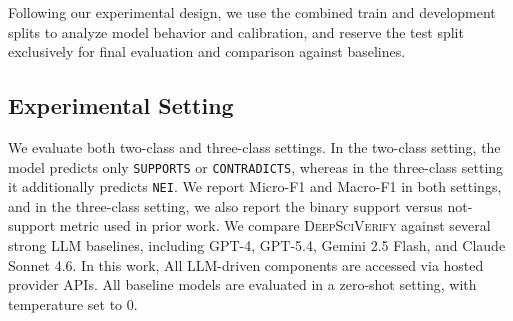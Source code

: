\documentclass{article}
\theoremstyle{plain}
\theoremstyle{definition}
\theoremstyle{remark}
\begin{document}
Following our experimental design, we use the combined train and development splits to analyze model behavior and calibration, and reserve the test split exclusively for final evaluation and comparison against baselines.




\subsection{Experimental Setting}
\label{sec:experimental_setting}

We evaluate both two-class and three-class settings. In the two-class setting, the model predicts only \texttt{SUPPORTS} or \texttt{CONTRADICTS}, whereas in the three-class setting it additionally predicts \texttt{NEI}. We report Micro-F1 and Macro-F1 in both settings, and in the three-class setting, we also report the binary support versus not-support metric used in prior work. We compare \textsc{DeepSciVerify} against several strong LLM baselines, including GPT-4, GPT-5.4, Gemini 2.5 Flash, and Claude Sonnet 4.6. In this work, All LLM-driven components are accessed via hosted provider APIs. All baseline models are evaluated in a zero-shot setting, with temperature set to 0.
\end{document}
